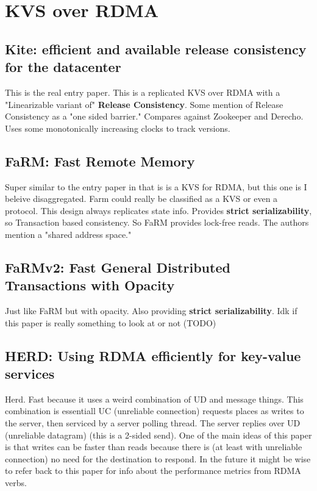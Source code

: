 \documentclass[sigplan,nonacm]{acmart}
\begin{document}
\section{KVS over RDMA}

    \subsection{Kite: efficient and available release consistency for the datacenter}
    This is the real entry paper. This is a replicated KVS over RDMA with a 
    "Linearizable variant of" \textbf{Release Consistency}. Some mention of Release Consistency
    as a "one sided barrier." Compares against Zookeeper and Derecho. Uses some 
    monotonically increasing clocks to track versions.\cite{Gavrielatos-PPoPP-2020} 

    \subsection{FaRM: Fast Remote Memory}
    Super similar to the entry paper in that is is a KVS for RDMA, but this one is I beleive disaggregated. 
    Farm could really be classified as a KVS or even a protocol. This design always replicates state info. 
    Provides \textbf{strict serializability}, so Transaction based consistency.
    So FaRM provides lock-free reads. The authors mention
    a "shared address space." \cite{Dragojevic-NSDI-2014}

    \subsection{FaRMv2: Fast General Distributed Transactions with Opacity}
    Just like FaRM but with opacity. Also providing \textbf{strict serializability}.
    Idk if this paper is really something to look at or not (TODO)\cite{Shamis-SIGMOD-2019}

    \subsection{HERD: Using RDMA efficiently for key-value services}
    Herd. Fast because it uses a weird combination of UD and message things.
    This combination is essentiall UC (unreliable connection) requests places 
    as writes to the server, then serviced by a server polling thread. The server replies over 
    UD (unreliable datagram) (this is a 2-sided send). One of the main ideas 
    of this paper is that writes can be faster than reads because there is 
    (at least with unreliable connection) no need for the destination to respond. 
    In the future it might be wise to refer back to this paper for info about the performance 
    metrics from RDMA verbs.\cite {Kalia-SIGCOMM-2014}
\end{document}
